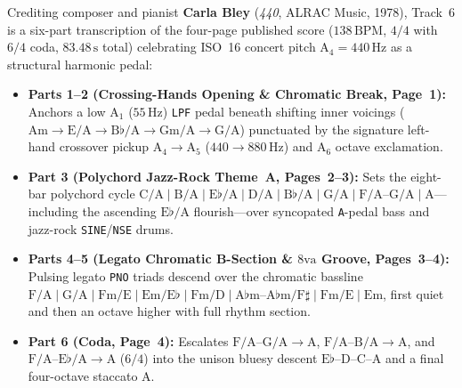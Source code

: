Crediting composer and pianist \textbf{Carla Bley} (\emph{440}, ALRAC Music, 1978), Track~6 is a six-part transcription of the four-page published score ($138\,\text{BPM}$, $4/4$ with $6/4$ coda, $83.48\,\text{s}$ total) celebrating ISO~16 concert pitch $\mathrm{A}_4 = 440\,\text{Hz}$ as a structural harmonic pedal:
\begin{itemize}[leftmargin=1.5em]
  \item \textbf{Parts 1--2 (Crossing-Hands Opening \& Chromatic Break, Page~1):} Anchors a low $\mathrm{A}_1$ ($55\,\text{Hz}$) \texttt{LPF} pedal beneath shifting inner voicings ($\mathrm{Am} \to \mathrm{E/A} \to \mathrm{B}\flat/\mathrm{A} \to \mathrm{Gm/A} \to \mathrm{G/A}$) punctuated by the signature left-hand crossover pickup $\mathrm{A}_4 \to \mathrm{A}_5$ ($440 \to 880\,\text{Hz}$) and $\mathrm{A}_6$ octave exclamation.
  \item \textbf{Part 3 (Polychord Jazz-Rock Theme~A, Pages~2--3):} Sets the eight-bar polychord cycle $\mathrm{C/A} \mid \mathrm{B/A} \mid \mathrm{E}\flat/\mathrm{A} \mid \mathrm{D/A} \mid \mathrm{B}\flat/\mathrm{A} \mid \mathrm{G/A} \mid \mathrm{F/A}\text{--}\mathrm{G/A} \mid \mathrm{A}$—including the ascending $\mathrm{E}\flat/\mathrm{A}$ flourish—over syncopated \texttt{A}-pedal bass and jazz-rock \texttt{SINE}/\texttt{NSE} drums.
  \item \textbf{Parts 4--5 (Legato Chromatic B-Section \& $8\mathrm{va}$ Groove, Pages~3--4):} Pulsing legato \texttt{PNO} triads descend over the chromatic bassline $\mathrm{F/A} \mid \mathrm{G/A} \mid \mathrm{Fm/E} \mid \mathrm{Em/E}\flat \mid \mathrm{Fm/D} \mid \mathrm{A}\flat\mathrm{m}\text{--}\mathrm{A}\flat\mathrm{m/F}\sharp \mid \mathrm{Fm/E} \mid \mathrm{Em}$, first quiet and then an octave higher with full rhythm section.
  \item \textbf{Part 6 (Coda, Page~4):} Escalates $\mathrm{F/A}\text{--}\mathrm{G/A}\to\mathrm{A}$, $\mathrm{F/A}\text{--}\mathrm{B/A}\to\mathrm{A}$, and $\mathrm{F/A}\text{--}\mathrm{E}\flat/\mathrm{A}\to\mathrm{A}$ ($6/4$) into the unison bluesy descent $\mathrm{E}\flat\text{--}\mathrm{D}\text{--}\mathrm{C}\text{--}\mathrm{A}$ and a final four-octave staccato $\mathrm{A}$.
\end{itemize}
